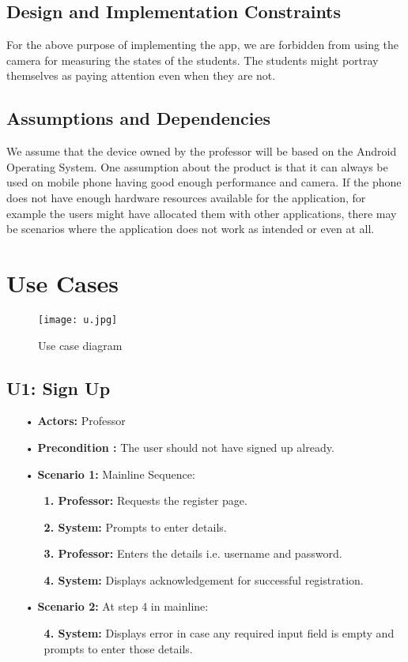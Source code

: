 \documentclass{scrreprt}
\begin{document}
\section{Design and Implementation Constraints}
For the above purpose of implementing the app, we are forbidden from using the camera
for measuring the states of the students. The students might portray themselves as paying attention even when they are not.

\section{Assumptions and Dependencies}
We assume that the device owned by the professor will be based on the
Android Operating System.
One assumption about the product is that it can always be used on mobile phone having good enough performance and camera. If the phone does not have enough hardware resources
available for the application, for example the users might have allocated them with other
applications, there may be scenarios where the application does not work as intended
or even at all.

\chapter{Use Cases}

\begin{figure}[h!]
\centering
\texttt{[image: u.jpg]}
\caption{Use case diagram}
\end{figure}

\section{U1: Sign Up}
\begin{itemize}
\item[•]
\textbf{Actors:} Professor
\item[•] \textbf{Precondition :} The user should not have signed up already.
\item[•]
\textbf{Scenario 1:} Mainline Sequence:
\begin{itemize}
  \item [] \textbf{1. Professor:} Requests the register page.
  \item [] \textbf{2. System:} Prompts to enter details.
  \item [] \textbf{3. Professor:} Enters the details i.e. username and password.
  \item [] \textbf{4. System:} Displays acknowledgement for successful registration.
\end{itemize}
\item[•]
\textbf{Scenario 2:} At step 4 in mainline:
\begin{itemize}
  \item [] \textbf{4. System:} Displays error in case any required input field is empty and prompts to enter those details.
\end{itemize}
\end{itemize}
\end{document}
